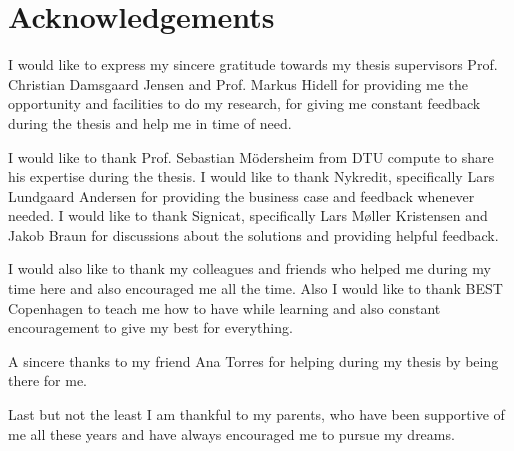 \chapter{Acknowledgements}

I would like to express my sincere gratitude towards my thesis supervisors Prof. Christian Damsgaard Jensen and Prof. Markus Hidell for providing me the opportunity and facilities to do my research, for giving me constant feedback during the thesis and help me in time of need.

I would like to thank Prof. Sebastian Mödersheim from DTU compute to share his expertise during the thesis. I would like to thank Nykredit, specifically Lars Lundgaard Andersen for providing the business case and feedback whenever needed. I would like to thank Signicat, specifically Lars Møller Kristensen and Jakob Braun for discussions about the solutions and providing helpful feedback.

I would also like to thank my colleagues and friends who helped me during my time here and also encouraged me all the time. Also I would like to thank BEST Copenhagen to teach me how to have while learning and also constant encouragement to give my best for everything.

A sincere thanks to my friend Ana Torres for helping during my thesis by being there for me.

Last but not the least I am thankful to my parents, who have been supportive of me all these years and have always encouraged me to pursue my dreams.